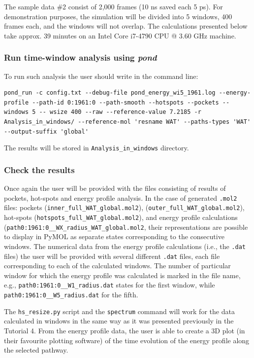 \documentclass[9pt,tutorial]{livecoms}
\begin{document}
The sample data \#2 consist of 2,000 frames (10 ns saved each 5 ps). For demonstration purposes, the simulation will be divided into 5 windows, 400 frames each, and the windows will not overlap. The calculations presented below take approx. 39 minutes on an Intel Core i7-4790 CPU @ 3.60 GHz machine.

\subsubsection{Run time-window analysis using \emph{pond}}
To run such analysis the user should write in the command line:
\begin{lstlisting}
pond_run -c config.txt --debug-file pond_energy_wi5_1961.log --energy-profile --path-id 0:1961:0 --path-smooth --hotspots --pockets --windows 5 -- wsize 400 --raw --reference-value 7.2185 -r Analysis_in_windows/ --reference-mol 'resname WAT' --paths-types 'WAT' --output-suffix 'global'
\end{lstlisting}
The results will be stored in \texttt{Analysis\_in\_windows} directory.

\subsubsection{Check the results}
Once again the user will be provided with the files consisting of results of pockets, hot-spots and energy profile analysis. In the case of generated \texttt{.mol2} files: pockets (\texttt{inner\_full\_WAT\_global.mol2}), (\texttt{outer\_full\_WAT\_global.mol2}), \hfill hot-spots (\texttt{hotspots\_full\_WAT\_global.mol2}), \hfill and \newline energy profile calculations \newline (\texttt{path0:1961:0\_\_WX\_radius\_WAT\_global.mol2}, their representations are possible to display in PyMOL as separate states corresponding to the consecutive windows. The numerical data from the energy profile calculations (i.e., the \texttt{.dat} files) the user will be provided with several different \texttt{.dat} files, each file corresponding to each of the calculated windows. The number of particular window for which the energy profile was calculated is marked in the file name, e.g., \texttt{path0:1961:0\_\_W1\_radius.dat} states for the first window, while \texttt{path0:1961:0\_\_W5\_radius.dat} for the fifth.

The \texttt{hs\_resize.py} script and the \texttt{spectrum} command will work for the data calculated in windows in the same way as it was presented previously in the Tutorial 4. From the energy profile data, the user is able to create a 3D plot (in their favourite plotting software) of the time evolution of the energy profile along the selected pathway.
\end{document}

